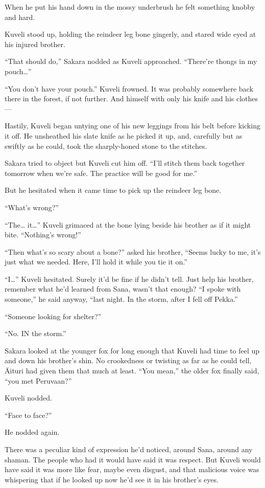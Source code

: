 When he put his hand down in the mossy underbrush he felt something knobby and hard.

Kuveli stood up, holding the reindeer leg bone gingerly, and stared wide eyed at his injured brother.

``That should do,'' Sakara nodded as Kuveli approached. ``There're thongs in my pouch\ldots''

``You don't have your pouch.'' Kuveli frowned. It was probably somewhere back there in the forest, if not further. And himself with only his knife and his clothes---

Hastily, Kuveli began untying one of his new leggings from his belt before kicking it off. He unsheathed his slate knife as he picked it up, and, carefully but as swiftly as he could, took the sharply-honed stone to the stitches.

Sakara tried to object but Kuveli cut him off. ``I'll stitch them back together tomorrow when we're safe. The practice will be good for me.''

But he hesitated when it came time to pick up the reindeer leg bone.

``What's wrong?''

``The\ldots{} it\ldots'' Kuveli grimaced at the bone lying beside his brother as if it might bite. ``Nothing's wrong!''

``Then what's so scary about a bone?'' asked his brother, ``Seems lucky to me, it's just what we needed. Here, I'll hold it while you tie it on.''

``I\ldots'' Kuveli hesitated. Surely it'd be fine if he didn't tell. Just help his brother, remember what he'd learned from Sana, wasn't that enough? ``I spoke with someone,'' he said anyway, ``last night. In the storm, after I fell off Pekka.''

``Someone looking for shelter?''

``No. IN the storm.''

Sakara looked at the younger fox for long enough that Kuveli had time to feel up and down his brother's shin. No crookedness or twisting as far as he could tell, Äituri had given them that much at least. ``You mean,'' the older fox finally said, ``you met Peruvaan?''

Kuveli nodded.

``Face to face?''

He nodded again.

There was a peculiar kind of expression he'd noticed, around Sana, around any shaman. The people who had it would have said it was respect. But Kuveli would have said it was more like fear, maybe even disgust, and that malicious voice was whispering that if he looked up now he'd see it in his brother's eyes.

